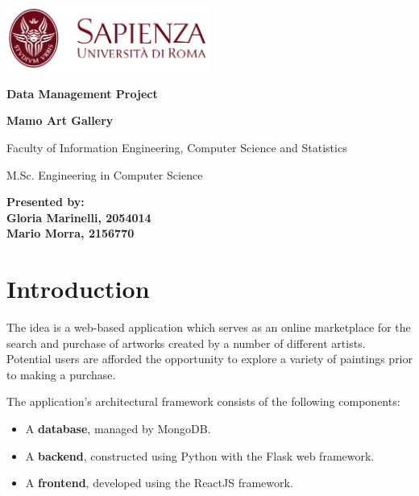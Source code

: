 \documentclass[a4paper,12pt]{article}
\begin{document}
\begin{titlepage}
    \begingroup
    \centering
    \includegraphics[width=0.5\textwidth]{sapienza.png}\par\vspace{1cm}

    {\bfseries\large Data Management Project \par}\vspace{0.5cm}

    {\bfseries\LARGE Mamo Art Gallery \par}\vspace{1cm}

    {\small Faculty of Information Engineering, Computer Science and Statistics
        \par}\vspace{0.1cm}

    {\small
        M.Sc. Engineering in Computer Science
        \par}\vspace{10cm}

    \endgroup

    {\textbf{\small
            Presented by: \\
            Gloria Marinelli, 2054014 \\
            Mario Morra, 2156770}}\vfill

\end{titlepage}

\tableofcontents
\newpage

\section{Introduction}
\justify
The idea is a web-based application which serves as an online marketplace for the search and purchase of artworks created by a number of different artists. Potential users are afforded the opportunity to explore a variety of paintings prior to making a purchase.

The application's architectural framework consists of the following components:

\begin{itemize}
    \item A \textbf{database}, managed by MongoDB.
    \item A \textbf{backend}, constructed using Python with the Flask web framework.
    \item A \textbf{frontend}, developed using the ReactJS framework.
\end{itemize}
\end{document}
